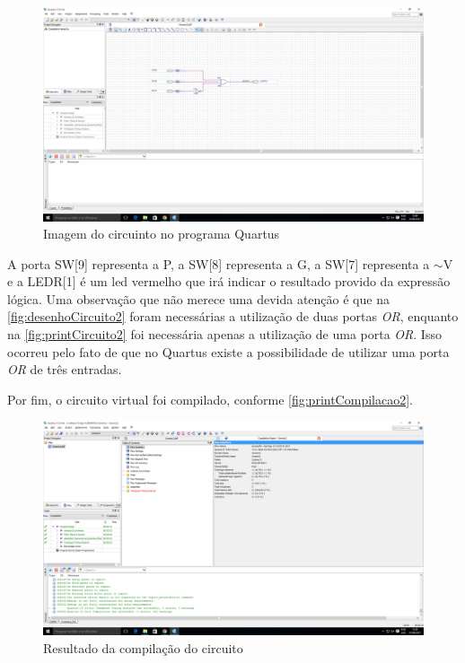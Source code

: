 \begin{figure}[htb]
    \centering
	\caption{\label{fig:printCircuito2}Imagem do circuinto no programa Quartus}
	\includegraphics[width=1\textwidth]{img/cenario2/printCircuito}
\end{figure}

A porta SW[9] representa a P, a SW[8] representa a G, a SW[7]
 representa a $\sim$V e a LEDR[1] é um led vermelho que irá
 indicar o resultado provido da expressão lógica. Uma observação que não merece uma devida atenção é que
 na \autoref{fig:desenhoCircuito2} foram necessárias a utilização de duas portas \textit{OR}, enquanto na
 \autoref{fig:printCircuito2} foi necessária apenas a utilização de uma porta \textit{OR}. Isso ocorreu pelo fato
 de que no Quartus existe a possibilidade de utilizar uma porta \textit{OR} de três entradas.

Por fim, o circuito virtual foi compilado, conforme \autoref{fig:printCompilacao2}.

\begin{figure}[htb]
    \centering
	\caption{\label{fig:printCompilacao2}Resultado da compilação do circuito}
	\includegraphics[width=1\textwidth]{img/cenario2/printCompilacao}
\end{figure}


